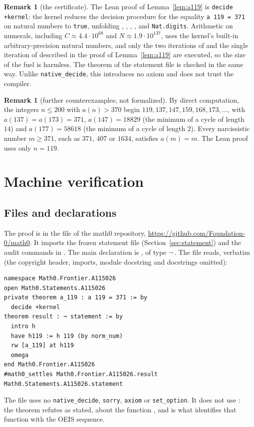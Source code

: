 \documentclass[11pt]{amsart}
\theoremstyle{plain}
\theoremstyle{definition}
\newtheorem{remark}[theorem]{Remark}
\begin{document}
\begin{remark}[the certificate]\label{rem:kernel}
The Lean proof of Lemma~\ref{lem:a119} is \texttt{decide +kernel}: the kernel reduces the decision procedure for the equality \texttt{a 119 = 371} on natural numbers to \texttt{true}, unfolding , , , ,  and \texttt{Nat.digits}. Arithmetic on numerals, including $C\approx4.4\cdot10^{68}$ and $N\approx1.9\cdot10^{137}$, uses the kernel's built-in arbitrary-precision natural numbers, and only the two iterations of  and the single iteration of  described in the proof of Lemma~\ref{lem:a119} are executed, so the size of the fuel is harmless. The theorem  of the statement file is checked in the same way. Unlike \texttt{native\_decide}, this introduces no axiom and does not trust the compiler.
\end{remark}

\begin{remark}[further counterexamples; not formalized]
By direct computation, the integers $n\le200$ with $a(n)>370$ begin $119,137,147,159,168,173,\dots$, with $a(137)=a(173)=371$, $a(147)=18829$ (the minimum of a cycle of length $14$) and $a(177)=58618$ (the minimum of a cycle of length $2$). Every narcissistic number $m\ge371$, such as $371$, $407$ or $1634$, satisfies $a(m)=m$. The Lean proof uses only $n=119$.
\end{remark}

\section{Machine verification}\label{sec:lean}

\subsection*{Files and declarations}
The proof is in the file  of the math0 repository, \url{https://github.com/Foundation-0/math0}. It imports the frozen statement file  (Section~\ref{sec:statement}) and the audit commands in . The main declaration is , of type $\neg$\,. The file reads, verbatim (the copyright header, imports, module docstring and docstrings omitted):
\begin{lstlisting}
namespace Math0.Frontier.A115026
open Math0.Statements.A115026
private theorem a_119 : a 119 = 371 := by
  decide +kernel
theorem result : ¬ statement := by
  intro h
  have h119 := h 119 (by norm_num)
  rw [a_119] at h119
  omega
end Math0.Frontier.A115026
#math0_settles Math0.Frontier.A115026.result Math0.Statements.A115026.statement
\end{lstlisting}
The file uses no \texttt{native\_decide}, \texttt{sorry}, \texttt{axiom} or \texttt{set\_option}. It does not use : the theorem  refutes  as stated, about the function , and  is what identifies that function with the OEIS sequence.
\end{document}
